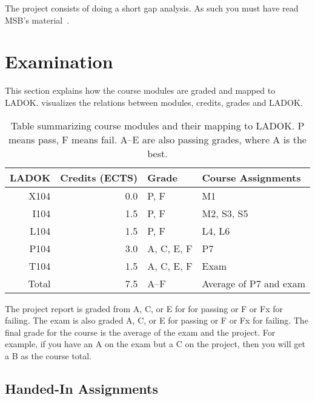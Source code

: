 \documentclass[a4paper]{llncs}
\begin{document}
The project consists of doing a short gap analysis.
As such you must have read MSB's material~\cite{%
  MSB2011itm,MSB2011sle,MSB2011p,MSB2011v,MSB2011r,%
  MSB2011gap,MSB2011vs,MSB2011us,MSB2011upo,%
	MSB2011pg,MSB2011koa,MSB2011i,MSB2011o,MSB2011g,%
	MSB2011lg,MSB2011ulo,MSB2011kf,MSB2011fa%
}.


\section{Examination}
\label{Examination}

This section explains how the course modules are graded and mapped to LADOK\@.
 visualizes the relations between modules, credits, grades and 
LADOK\@.

\begin{table}
  \centering
  \caption{%
    Table summarizing course modules and their mapping to LADOK\@.
    P means pass, F means fail.
    A--E are also passing grades, where A is the best.
  }\label{LADOKTable}
  \begin{tabular}{rrll}
    \toprule
    LADOK & Credits (ECTS)  & Grade       & Course Assignments\\
    \midrule
    X104  & 0.0             & P, F        & M1\\
    I104  & 1.5             & P, F        & M2, S3, S5\\
    L104  & 1.5             & P, F        & L4, L6\\
    P104  & 3.0             & A, C, E, F  & P7\\
    T104  & 1.5             & A, C, E, F  & Exam\\
    \midrule
    Total & 7.5             & A--F        & Average of P7 and exam\\
    \bottomrule
  \end{tabular}
\end{table}

The project report is graded from A, C, or E for for passing or F or Fx for 
failing.
The exam is also graded A, C, or E for passing or F or Fx for failing.
The final grade for the course is the average of the exam and the project.
For example, if you have an A on the exam but a C on the project, then you will 
get a B as the course total.

\subsection{Handed-In Assignments}
\end{document}
